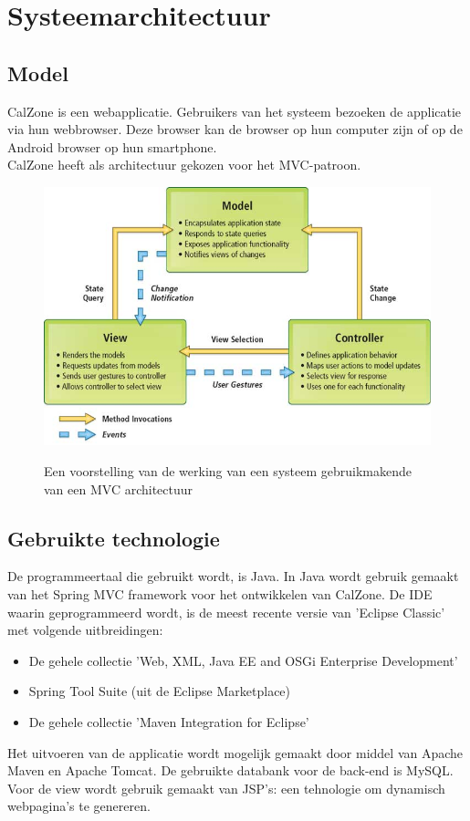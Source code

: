 \chapter{Systeemarchitectuur}
\label{chap:architectuur}

\section{Model}
\label{sec:model}
CalZone is een webapplicatie. Gebruikers van het systeem bezoeken de applicatie via hun webbrowser. Deze browser kan de browser op hun computer zijn of op de Android browser op hun smartphone.
\\
CalZone heeft als architectuur gekozen voor het MVC-patroon.\cite{mvc}

\begin{figure}[H]
	\centering
	\includegraphics[scale=0.5]{img/mvc}
	\label{fig:mvc}
	\caption{Een voorstelling van de werking van een systeem gebruikmakende van een MVC architectuur}
\end{figure}

\section{Gebruikte technologie}
\label{sec:technologie}
De programmeertaal die gebruikt wordt, is Java. 
In Java wordt gebruik gemaakt van het Spring MVC framework\cite{spring, spring-mvc} voor het ontwikkelen van CalZone. 
De IDE waarin geprogrammeerd wordt, is de meest recente versie van 'Eclipse Classic' met volgende uitbreidingen:

\begin{itemize}
	\item De gehele collectie 'Web, XML, Java EE and OSGi Enterprise Development'	
	\item Spring Tool Suite (uit de Eclipse Marketplace)
	\item De gehele collectie 'Maven Integration for Eclipse'
\end{itemize}
\noindent
Het uitvoeren van de applicatie wordt mogelijk gemaakt door middel van Apache Maven\cite{Maven} en Apache Tomcat\cite{Tomcat}.
De gebruikte databank voor de back-end is MySQL. 
Voor de view wordt gebruik gemaakt van JSP's: een tehnologie om dynamisch webpagina's te genereren.
